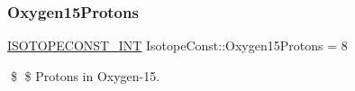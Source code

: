 \subsubsection{\texorpdfstring{Oxygen15\+Protons}{Oxygen15Protons}}
{\footnotesize\ttfamily \mbox{\hyperlink{group___isotope_const-_macros_ga5f18360b3e99483a35c32d789e62621c}{I\+S\+O\+T\+O\+P\+E\+C\+O\+N\+S\+T\+\_\+\+I\+NT}} Isotope\+Const\+::\+Oxygen15\+Protons = 8}

\$ \$ Protons in Oxygen-\/15. 